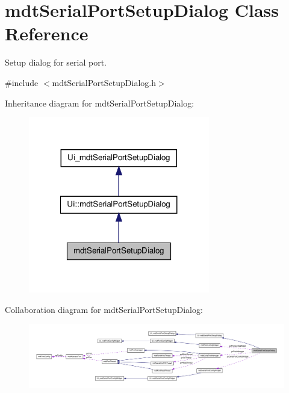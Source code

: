 \hypertarget{classmdt_serial_port_setup_dialog}{
\section{mdtSerialPortSetupDialog Class Reference}
\label{classmdt_serial_port_setup_dialog}
}


Setup dialog for serial port.  




{\ttfamily \#include $<$mdtSerialPortSetupDialog.h$>$}



Inheritance diagram for mdtSerialPortSetupDialog:\nopagebreak
\begin{figure}[H]
\begin{center}
\leavevmode
\includegraphics[width=224pt]{classmdt_serial_port_setup_dialog__inherit__graph}
\end{center}
\end{figure}


Collaboration diagram for mdtSerialPortSetupDialog:\nopagebreak
\begin{figure}[H]
\begin{center}
\leavevmode
\includegraphics[width=400pt]{classmdt_serial_port_setup_dialog__coll__graph}
\end{center}
\end{figure}
